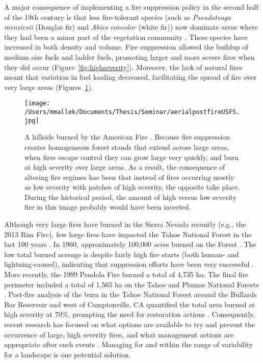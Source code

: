 A major consequence of implementing a fire suppression policy in the second half of the 19th century is that less fire-tolerant species (such as \emph{Pseudotsuga menziesii} (Douglas fir) and \emph{Abies concolor} (white fir)) now dominate areas where they had been a minor part of the vegetation community \citep{Beaty2007,Stephens2015}. These species have increased in both density and volume. Fire suppression allowed the buildup of medium size fuels and ladder fuels, promoting larger and more severe fires when they did occur (Figure~\ref{fig:highseverity}). Moreover, the lack of natural fires meant that variation in fuel loading decreased, facilitating the spread of fire over very large areas \citep{Hessburg2005,Beaty2007,Meyer2008} (Figures~\ref{fig:bigfirephoto}).

\begin{figure}[!htbp]
\centering
\texttt{[image: /Users/mmallek/Documents/Thesis/Seminar/aerialpostfireUSFS.jpg]}
\caption{A hillside burned by the American Fire \citep{americanfirephoto}. Because fire suppression creates homogeneous forest stands that extend across large areas, when fires escape control they can grow large very quickly, and burn at high severity over large areas. As a result, the consequence of altering fire regimes has been that instead of fires occurring mostly as low severity with patches of high severity, the opposite take place. During the historical period, the amount of high versus low severity fire in this image probably would have been inverted.} 
\label{fig:bigfirephoto}
\end{figure}


Although very large fires have burned in the Sierra Nevada recently (e.g., the 2013 Rim Fire), few large fires have impacted the Tahoe National Forest in the last 100 years \citep{USDAForestService1990}. In 1960, approximately 100,000 acres burned on the Forest \citep{USDAForestService1990}. The low total burned acreage is despite fairly high fire starts (both human- and lightning-caused), indicating that suppression efforts have been very successful \citep{USDAForestService1990,calfire2012,usgs-fire-data2012}. More recently, the 1999 Pendola Fire burned a total of 4,735 ha. The final fire perimeter included a total of 1,565 ha on the Tahoe and Plumas National Forests \citep{Shaw2009,USDOJ2009}. Post-fire analysis of the burn in the Tahoe National Forest around the Bullards Bar Reservoir and west of Camptonville, CA quantified the total area burned at high severity at 70\%, prompting the need for restoration actions \citep{USDAForestService1999}. Consequently, recent research has focused on what options are available to try and prevent the occurrence of large, high severity fires, and what management actions are appropriate after such events \citep{Stephens2013,North2010}. Managing for and within the range of variability for a landscape is one potential solution.



